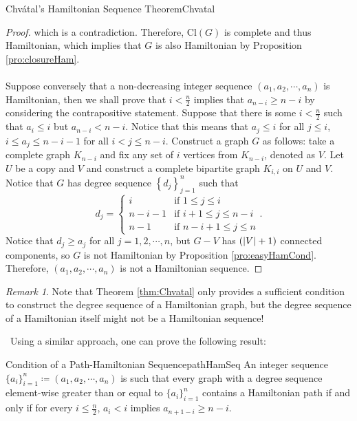 \documentclass[math, code]{amznotes}
\theoremstyle{remark}
\newtheorem*{remark}{Remark}
\begin{document}
\begin{thmbox}{Chv\'{a}tal's Hamiltonian Sequence Theorem}{Chvatal}
\begin{proof}
        which is a contradiction. Therefore, $\mathrm{Cl}(G)$ is complete and thus Hamiltonian, which implies that $G$ is also Hamiltonian by Proposition \ref{pro:closureHam}.
        \\\\
        Suppose conversely that a non-decreasing integer sequence $(a_1, a_2, \cdots, a_n)$ is Hamiltonian, then we shall prove that $i < \frac{n}{2}$ implies that $a_{n - i} \geq n - i$ by considering the contrapositive statement. Suppose that there is some $i < \frac{n}{2}$ such that $a_i \leq i$ but $a_{n - i} < n - i$. Notice that this means that $a_j \leq i$ for all $j \leq i$, $i \leq a_j \leq n - i - 1$ for all $i < j \leq n - i$. Construct a graph $G$ as follows: take a complete graph $K_{n - i}$ and fix any set of $i$ vertices from $K_{n - i}$, denoted as $V$. Let $U$ be a copy and $V$ and construct a complete bipartite graph $K_{i, i}$ on $U$ and $V$. Notice that $G$ has degree sequence $\left\{d_j\right\}_{j = 1}^{n}$ such that 
        \begin{equation*}
            d_j = \begin{cases}
                i & \textrm{if } 1 \leq j \leq i \\
                n - i - 1 & \textrm{if } i + 1 \leq j \leq n - i \\
                n - 1 & \textrm{if } n - i + 1 \leq j \leq n
            \end{cases}.
        \end{equation*}
        Notice that $d_j \geq a_j$ for all $j = 1, 2, \cdots, n$, but $G - V$ has $({\left\lvert {V} \right\rvert} + 1)$ connected components, so $G$ is not Hamiltonian by Proposition \ref{pro:easyHamCond}. Therefore, $(a_1, a_2, \cdots, a_n)$ is not a Hamiltonian sequence.
    \end{proof}
\end{thmbox}
\begin{notebox}
    \begin{remark}      
        Note that Theorem \ref{thm:Chvatal} only provides a sufficient condition to construct the degree sequence of a Hamiltonian graph, but the degree sequence of a Hamiltonian itself might not be a Hamiltonian sequence!  
    \end{remark}        
\end{notebox}\
Using a similar approach, one can prove the following result:
\begin{thmbox}{Condition of a Path-Hamiltonian Sequence}{pathHamSeq}
    An integer sequence $\{a_i\}_{i = 1}^n \coloneqq (a_1, a_2, \cdots, a_n)$ is such that every graph with a degree sequence element-wise greater than or equal to $\{a_i\}_{i = 1}^n$ contains a Hamiltonian path if and only if for every $i \leq \frac{n}{2}$, $a_i < i$ implies $a_{n + 1 - i} \geq n - i$.
\end{thmbox}
\end{document}
